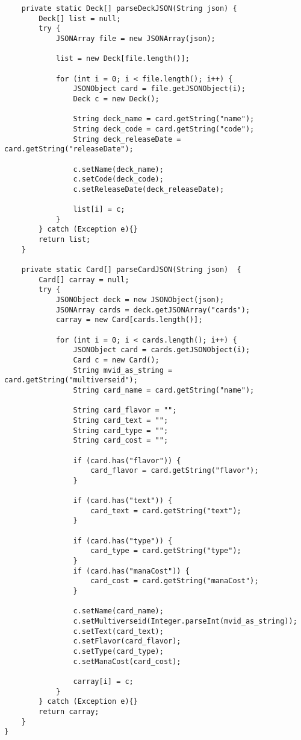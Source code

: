 \begin{lstlisting}
    private static Deck[] parseDeckJSON(String json) {
        Deck[] list = null;
        try {
            JSONArray file = new JSONArray(json);

            list = new Deck[file.length()];

            for (int i = 0; i < file.length(); i++) {
                JSONObject card = file.getJSONObject(i);
                Deck c = new Deck();

                String deck_name = card.getString("name");
                String deck_code = card.getString("code");
                String deck_releaseDate = card.getString("releaseDate");

                c.setName(deck_name);
                c.setCode(deck_code);
                c.setReleaseDate(deck_releaseDate);

                list[i] = c;
            }
        } catch (Exception e){}
        return list;
    }

    private static Card[] parseCardJSON(String json)  {
        Card[] carray = null;
        try {
            JSONObject deck = new JSONObject(json);
            JSONArray cards = deck.getJSONArray("cards");
            carray = new Card[cards.length()];

            for (int i = 0; i < cards.length(); i++) {
                JSONObject card = cards.getJSONObject(i);
                Card c = new Card();
                String mvid_as_string = card.getString("multiverseid");
                String card_name = card.getString("name");

                String card_flavor = "";
                String card_text = "";
                String card_type = "";
                String card_cost = "";

                if (card.has("flavor")) {
                    card_flavor = card.getString("flavor");
                }

                if (card.has("text")) {
                    card_text = card.getString("text");
                }

                if (card.has("type")) {
                    card_type = card.getString("type");
                }
                if (card.has("manaCost")) {
                    card_cost = card.getString("manaCost");
                }

                c.setName(card_name);
                c.setMultiverseid(Integer.parseInt(mvid_as_string));
                c.setText(card_text);
                c.setFlavor(card_flavor);
                c.setType(card_type);
                c.setManaCost(card_cost);

                carray[i] = c;
            }
        } catch (Exception e){}
        return carray;
    }
}
\end{lstlisting}
\newpage

